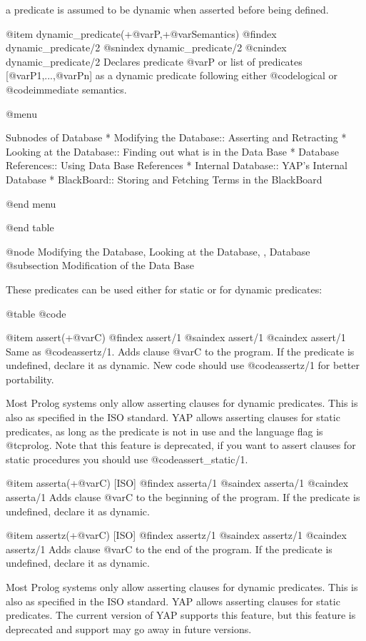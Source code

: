 {{{{{{a predicate is assumed to be dynamic when 
asserted before being defined.

@item dynamic_predicate(+@var{P},+@var{Semantics})
@findex dynamic_predicate/2
@snindex dynamic_predicate/2
@cnindex dynamic_predicate/2
Declares predicate @var{P} or list of predicates [@var{P1},...,@var{Pn}]
as a dynamic predicate following either @code{logical} or
@code{immediate} semantics.

@menu

Subnodes of Database
* Modifying the Database:: Asserting and Retracting
* Looking at the Database:: Finding out what is in the Data Base
* Database References:: Using Data Base References
* Internal Database:: YAP's Internal Database
* BlackBoard:: Storing and Fetching Terms in the BlackBoard

@end menu

@end table

@node Modifying the Database, Looking at the Database, , Database
@subsection Modification of the Data Base

These predicates can be used either for static or for dynamic
predicates:

@table @code

@item assert(+@var{C})
@findex assert/1
@saindex assert/1
@caindex assert/1
 Same as @code{assertz/1}. Adds clause @var{C} to the program. If the predicate is undefined,
declare it as dynamic. New code should use @code{assertz/1} for better portability.

 Most Prolog systems only allow asserting clauses for dynamic
predicates. This is also as specified in the ISO standard. YAP allows
asserting clauses for static predicates, as long as the predicate is not
in use and the language flag is @t{cprolog}. Note that this feature is
deprecated, if you want to assert clauses for static procedures you
should use @code{assert_static/1}.

@item asserta(+@var{C}) [ISO]
@findex asserta/1
@saindex asserta/1
@caindex asserta/1
 Adds clause @var{C} to the beginning of the program. If the predicate is
undefined, declare it as dynamic.

@item assertz(+@var{C}) [ISO]
@findex assertz/1
@saindex assertz/1
@caindex assertz/1
 Adds clause @var{C} to the end of the program. If the predicate is
undefined, declare it as dynamic.

 Most Prolog systems only allow asserting clauses for dynamic
predicates. This is also as specified in the ISO standard. YAP allows
asserting clauses for static predicates. The current version of YAP
supports this feature, but this feature is deprecated and support may go
away in future versions.

}}}}}}
